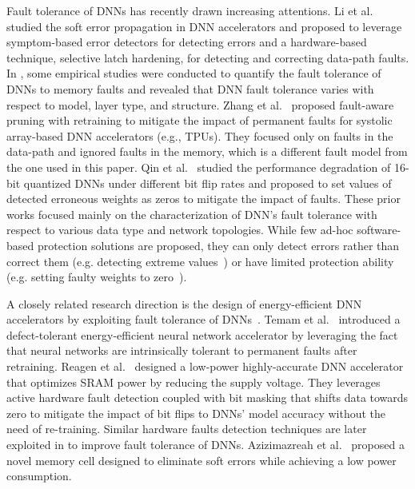 \documentclass{article}
\begin{document}
Fault tolerance of DNNs has recently drawn increasing attentions. 
Li et al.~\cite{li2017understanding} studied the soft error propagation in DNN accelerators and proposed to leverage symptom-based error detectors for detecting errors and a hardware-based technique, selective latch hardening,  for detecting and correcting data-path faults. In \cite{reagen2018ares, arechiga2018the},  some empirical studies were conducted to quantify the fault tolerance of DNNs to memory faults and revealed that DNN fault tolerance varies with respect to model, layer type, and structure. Zhang et al.~\cite{zhang2018analyzing} proposed fault-aware pruning with retraining to mitigate the impact of permanent faults for systolic array-based DNN accelerators (e.g., TPUs). They focused only on faults in the data-path and ignored faults in the memory, which is a different fault model from the one used in this paper.  Qin et al.~\cite{qin2017robustness} studied the performance degradation of 16-bit quantized DNNs under different bit flip rates and proposed to set values of detected erroneous weights as zeros to mitigate the impact of faults. These prior works focused mainly on the characterization of DNN's fault tolerance with respect to various data type and network topologies. While few ad-hoc software-based protection solutions are proposed, they can only detect errors rather than correct them (e.g. detecting extreme values~\cite{li2017understanding}) or have limited protection ability (e.g. setting faulty weights to zero~\cite{qin2017robustness}).        

A closely related research direction is the design of energy-efficient DNN accelerators by exploiting fault tolerance of DNNs~\cite{temam2012defect, reagen2016minerva, kim2018energy, zhang2018thundervolt}. 
Temam et al.~\cite{temam2012defect} introduced a defect-tolerant energy-efficient neural network accelerator by leveraging the fact that neural networks are intrinsically tolerant to permanent faults after retraining. 
Reagen et al.~\cite{reagen2016minerva} designed a low-power highly-accurate DNN accelerator that optimizes SRAM power by reducing the supply voltage. They leverages active hardware fault detection coupled with bit masking that shifts data towards zero to mitigate the impact of bit flips to DNNs' model accuracy without the need of re-training. 
Similar hardware faults detection techniques are later exploited in \cite{whatmough201714, salami2018resilience, zhang2018thundervolt, hacene2019training} to improve fault tolerance of DNNs. Azizimazreah et al.~\cite{azizimazreah2018tolerating} proposed a novel memory cell designed to eliminate soft errors while achieving a low power consumption.  
\end{document}
